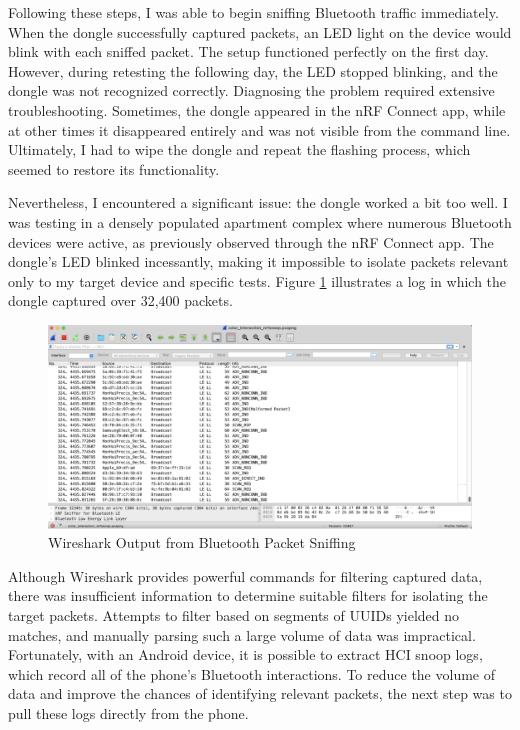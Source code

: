 Following these steps, I was able to begin sniffing Bluetooth traffic immediately. When the dongle successfully captured packets, an LED light on the device would blink with each sniffed packet. The setup functioned perfectly on the first day. However, during retesting the following day, the LED stopped blinking, and the dongle was not recognized correctly. Diagnosing the problem required extensive troubleshooting. Sometimes, the dongle appeared in the nRF Connect app, while at other times it disappeared entirely and was not visible from the command line. Ultimately, I had to wipe the dongle and repeat the flashing process, which seemed to restore its functionality.

Nevertheless, I encountered a significant issue: the dongle worked a bit too well. I was testing in a densely populated apartment complex where numerous Bluetooth devices were active, as previously observed through the nRF Connect app. The dongle’s LED blinked incessantly, making it impossible to isolate packets relevant only to my target device and specific tests. Figure \ref{fig:wiresharkpacketsniffing} illustrates a log in which the dongle captured over 32,400 packets.

\begin{figure}
	\centering
	\includegraphics[width=0.7\linewidth]{wireshark_packet_sniffing}
	\caption{Wireshark Output from Bluetooth Packet Sniffing}
	\label{fig:wiresharkpacketsniffing}
\end{figure}

Although Wireshark provides powerful commands for filtering captured data, there was insufficient information to determine suitable filters for isolating the target packets. Attempts to filter based on segments of UUIDs yielded no matches, and manually parsing such a large volume of data was impractical. Fortunately, with an Android device, it is possible to extract HCI snoop logs, which record all of the phone’s Bluetooth interactions. To reduce the volume of data and improve the chances of identifying relevant packets, the next step was to pull these logs directly from the phone.

